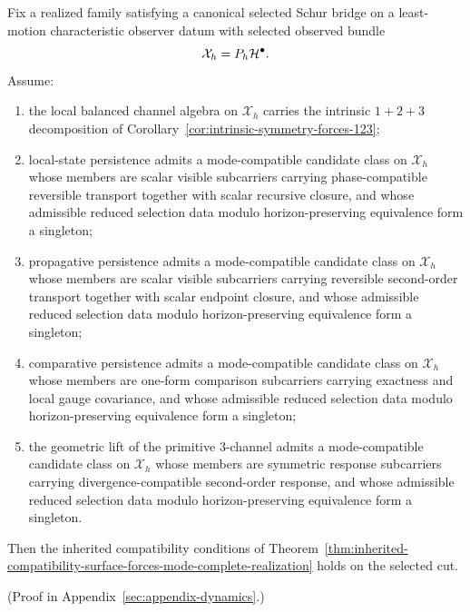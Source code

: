 \begin{corollary}
\label{cor:mode-wise-candidate-forcing-yields-compatibility-surface}
Fix a realized family satisfying a canonical selected Schur bridge on a
least-motion characteristic observer datum with selected observed bundle
\[
\mathcal X_h=P_h\mathcal{H}^\bullet.
\]
Assume:
\begin{enumerate}[label=(\roman*), leftmargin=2em, itemsep=0.2em]
\item the local balanced channel algebra on \(\mathcal X_h\) carries the
      intrinsic \(1+2+3\) decomposition of
      Corollary~\ref{cor:intrinsic-symmetry-forces-123};
\item local-state persistence admits a mode-compatible candidate class on
      \(\mathcal X_h\) whose members are scalar visible subcarriers carrying
      phase-compatible reversible transport together with scalar recursive
      closure, and whose admissible reduced selection data modulo
      horizon-preserving equivalence form a singleton;
\item propagative persistence admits a mode-compatible candidate class on
      \(\mathcal X_h\) whose members are scalar visible subcarriers carrying
      reversible second-order transport together with scalar endpoint closure,
      and whose admissible reduced selection data modulo
      horizon-preserving equivalence form a singleton;
\item comparative persistence admits a mode-compatible candidate class on
      \(\mathcal X_h\) whose members are one-form comparison subcarriers
      carrying exactness and local gauge covariance, and whose admissible
      reduced selection data modulo horizon-preserving equivalence form a
      singleton;
\item the geometric lift of the primitive \(3\)-channel admits a
      mode-compatible candidate class on \(\mathcal X_h\) whose members are
      symmetric response subcarriers carrying divergence-compatible
      second-order response, and whose admissible reduced selection data
      modulo horizon-preserving equivalence form a singleton.
\end{enumerate}
Then the inherited compatibility conditions of
Theorem~\ref{thm:inherited-compatibility-surface-forces-mode-complete-realization}
holds on the selected cut.
\end{corollary}

(Proof in Appendix~\ref{sec:appendix-dynamics}.)

